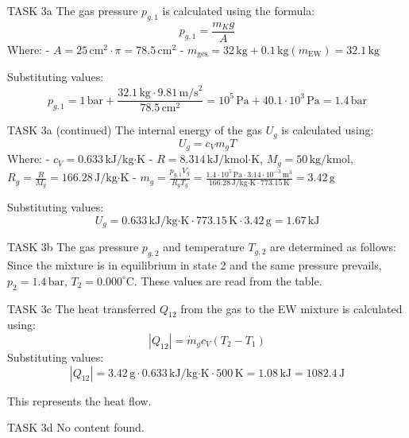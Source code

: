 TASK 3a  
The gas pressure \( p_{g,1} \) is calculated using the formula:  
\[
p_{g,1} = \frac{m_K g}{A}
\]  
Where:  
- \( A = 25 \, \text{cm}^2 \cdot \pi = 78.5 \, \text{cm}^2 \)  
- \( m_{\text{ges}} = 32 \, \text{kg} + 0.1 \, \text{kg} (m_{\text{EW}}) = 32.1 \, \text{kg} \)  

Substituting values:  
\[
p_{g,1} = 1 \, \text{bar} + \frac{32.1 \, \text{kg} \cdot 9.81 \, \text{m/s}^2}{78.5 \, \text{cm}^2} = 10^5 \, \text{Pa} + 40.1 \cdot 10^3 \, \text{Pa} = 1.4 \, \text{bar}
\]  

TASK 3a (continued)  
The internal energy of the gas \( U_g \) is calculated using:  
\[
U_g = c_V m_g T
\]  
Where:  
- \( c_V = 0.633 \, \text{kJ/kg·K} \)  
- \( R = 8.314 \, \text{kJ/kmol·K} \), \( M_g = 50 \, \text{kg/kmol} \), \( R_g = \frac{R}{M_g} = 166.28 \, \text{J/kg·K} \)  
- \( m_g = \frac{p_{g,1} V_g}{R_g T_g} = \frac{1.4 \cdot 10^5 \, \text{Pa} \cdot 3.14 \cdot 10^{-3} \, \text{m}^3}{166.28 \, \text{J/kg·K} \cdot 773.15 \, \text{K}} = 3.42 \, \text{g} \)  

Substituting values:  
\[
U_g = 0.633 \, \text{kJ/kg·K} \cdot 773.15 \, \text{K} \cdot 3.42 \, \text{g} = 1.67 \, \text{kJ}
\]  

TASK 3b  
The gas pressure \( p_{g,2} \) and temperature \( T_{g,2} \) are determined as follows:  
Since the mixture is in equilibrium in state 2 and the same pressure prevails, \( p_2 = 1.4 \, \text{bar} \), \( T_2 = 0.000^\circ\text{C} \). These values are read from the table.  

TASK 3c  
The heat transferred \( Q_{12} \) from the gas to the EW mixture is calculated using:  
\[
|Q_{12}| = \dot{m}_g c_V (T_2 - T_1)
\]  
Substituting values:  
\[
|Q_{12}| = 3.42 \, \text{g} \cdot 0.633 \, \text{kJ/kg·K} \cdot 500 \, \text{K} = 1.08 \, \text{kJ} = 1082.4 \, \text{J}
\]  

This represents the heat flow.  

TASK 3d  
No content found.